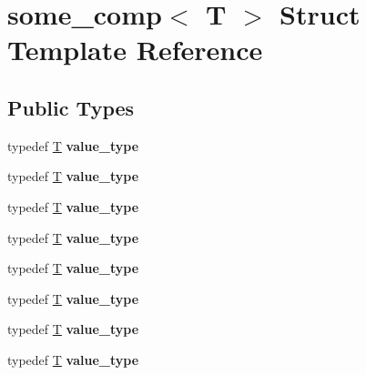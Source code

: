 \hypertarget{structsome__comp}{}\section{some\+\_\+comp$<$ T $>$ Struct Template Reference}
\label{structsome__comp}
\subsection*{Public Types}
\begin{DoxyCompactItemize}
\item 
\mbox{\label{structsome__comp_aec7cb3ba940c1fe5fc3cb92f8ea1f3ce}} 
typedef \mbox{\hyperlink{struct_t}{T}} {\bfseries value\+\_\+type}
\item 
\mbox{\label{structsome__comp_aec7cb3ba940c1fe5fc3cb92f8ea1f3ce}} 
typedef \mbox{\hyperlink{struct_t}{T}} {\bfseries value\+\_\+type}
\item 
\mbox{\label{structsome__comp_aec7cb3ba940c1fe5fc3cb92f8ea1f3ce}} 
typedef \mbox{\hyperlink{struct_t}{T}} {\bfseries value\+\_\+type}
\item 
\mbox{\label{structsome__comp_aec7cb3ba940c1fe5fc3cb92f8ea1f3ce}} 
typedef \mbox{\hyperlink{struct_t}{T}} {\bfseries value\+\_\+type}
\item 
\mbox{\label{structsome__comp_aec7cb3ba940c1fe5fc3cb92f8ea1f3ce}} 
typedef \mbox{\hyperlink{struct_t}{T}} {\bfseries value\+\_\+type}
\item 
\mbox{\label{structsome__comp_aec7cb3ba940c1fe5fc3cb92f8ea1f3ce}} 
typedef \mbox{\hyperlink{struct_t}{T}} {\bfseries value\+\_\+type}
\item 
\mbox{\label{structsome__comp_aec7cb3ba940c1fe5fc3cb92f8ea1f3ce}} 
typedef \mbox{\hyperlink{struct_t}{T}} {\bfseries value\+\_\+type}
\item 
\mbox{\label{structsome__comp_aec7cb3ba940c1fe5fc3cb92f8ea1f3ce}} 
typedef \mbox{\hyperlink{struct_t}{T}} {\bfseries value\+\_\+type}
\item 
\mbox{\label{structsome__comp_aec7cb3ba940c1fe5fc3cb92f8ea1f3ce}} 

\end{DoxyCompactItemize}

